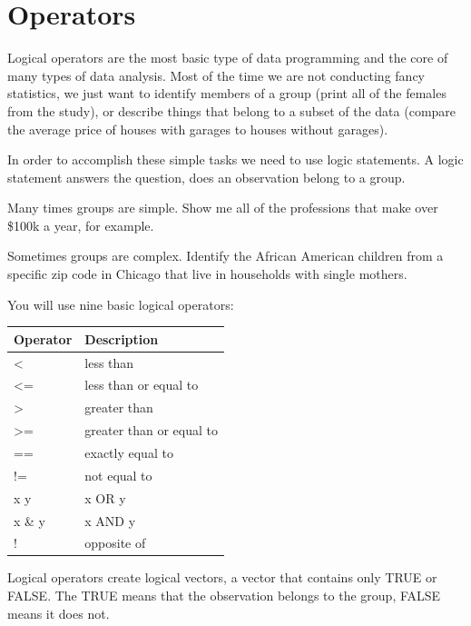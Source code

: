 \documentclass[]{book}
\theoremstyle{definition}
\theoremstyle{definition}
\theoremstyle{definition}
\theoremstyle{remark}
\begin{document}
\hypertarget{operators}{%
\chapter{Operators}\label{operators}}

Logical operators are the most basic type of data programming and the
core of many types of data analysis. Most of the time we are not
conducting fancy statistics, we just want to identify members of a group
(print all of the females from the study), or describe things that
belong to a subset of the data (compare the average price of houses with
garages to houses without garages).

In order to accomplish these simple tasks we need to use logic
statements. A logic statement answers the question, does an observation
belong to a group.

Many times groups are simple. Show me all of the professions that make
over \$100k a year, for example.

Sometimes groups are complex. Identify the African American children
from a specific zip code in Chicago that live in households with single
mothers.

You will use nine basic logical operators:

\begin{longtable}[]{@{}ll@{}}
\toprule
Operator & Description\tabularnewline
\midrule
\endhead
\textless{} & less than\tabularnewline
\textless{}= & less than or equal to\tabularnewline
\textgreater{} & greater than\tabularnewline
\textgreater{}= & greater than or equal to\tabularnewline
== & exactly equal to\tabularnewline
!= & not equal to\tabularnewline
x \textbar{} y & x OR y\tabularnewline
x \& y & x AND y\tabularnewline
! & opposite of\tabularnewline
\bottomrule
\end{longtable}

Logical operators create logical vectors, a vector that contains only
TRUE or FALSE. The TRUE means that the observation belongs to the group,
FALSE means it does not.
\end{document}
